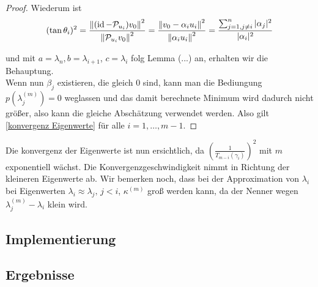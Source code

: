 \documentclass{article}
\begin{document}
\begin{theorem}
\begin{proof}
	Wiederum ist
	\begin{equation*}
		(\tan\theta_i)^2 = \frac{{\left \| (\operatorname{id} - \mathcal{P}_{u_i})v_0 \right \|}_{}^2}{{\left \|  \mathcal{P}_{u_i}v_0 \right \|}_{}^2} = \frac{{\left \| v_0 - \alpha_i u_i \right \|}_{}^2}{{\left \| \alpha_i u_i \right \|}_{}^2} = \frac{\sum_{\substack{j=1, j\neq i}}^{n} |\alpha_j|^2}{|\alpha_i|^2}
	\end{equation*}

	und  mit $a = \lambda_n, b= \lambda_{i+1}$, $c = \lambda_i$ folg Lemma (...) an, erhalten wir die Behauptung.\\

	Wenn nun $\beta_j$ existieren, die gleich 0 sind, kann man die Bediungung $p(\lambda_j^{(m)}) = 0$ weglassen und das damit berechnete Minimum wird dadurch nicht größer, also kann die gleiche Abschätzung verwendet werden.
	Also gilt \ref{konvergenz Eigenwerte} für alle $i = 1, \dots, m-1$.
	\end{proof}
\end{theorem}

Die konvergenz der Eigenwerte ist nun ersichtlich, da $\left(\frac{1}{T_{m-i}(\gamma_i)}\right)^2$ mit $m$ exponentiell wächst. Die Konvergenzgeschwindigkeit nimmt in Richtung der kleineren Eigenwerte ab. Wir bemerken noch, dass bei der Approximation von $\lambda_i$ bei Eigenwerten $\lambda_i \approx \lambda_j, \, j < i$, $\kappa^{(m)}$ groß werden kann, da der Nenner wegen $\lambda^{(m)}_j - \lambda_i$ klein wird.


\subsection{Implementierung}

\subsection{Ergebnisse}

\newpage

\end{document}
